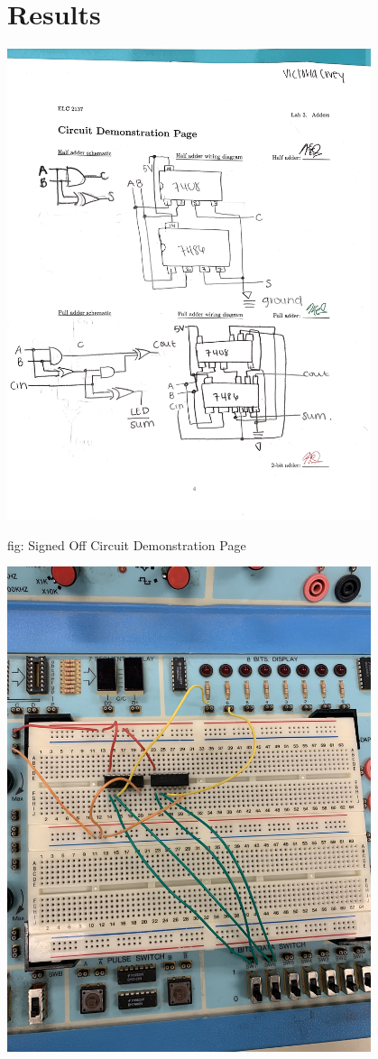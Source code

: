 \documentclass[11pt]{article}
\begin{document}
\section*{Results}
\begin{center}

	\includegraphics[width=0.8\textwidth,trim=0cm 6cm 0.6cm 4cm,clip]{Circuit_Demonstration}

\caption{fig: Signed Off Circuit Demonstration Page}

	\includegraphics[width=0.8\textwidth,trim=0cm 0cm 0.6cm 0cm,clip]{HA}
	

\end{center}
\end{document}
